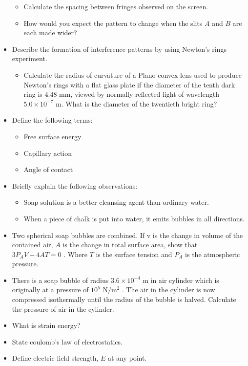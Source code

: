 \documentclass{article}
\begin{document}
\begin{itemize}
 \begin{itemize}
\item Calculate the spacing between fringes observed on the screen.
\item How would you expect the pattern to change when the slits $ A$ and $ B$ are each made wider?
\end{itemize}
\item Describe the formation of interference patterns by using Newton’s rings experiment.
 \begin{itemize}
\item Calculate the radius of curvature of a Plano-convex lens used to produce Newton’s rings with a flat glass plate if the diameter of the tenth dark ring is $ 4.48$ mm, viewed by normally reflected light of wavelength $ 5.0 \times 10^{-7}$ m.  What is the diameter of the twentieth bright ring?
\end{itemize}
\item Define the following terms:
 \begin{itemize}
\item Free surface energy
\item Capillary action
\item Angle of contact
\end{itemize}
\item Briefly explain the following observations:
 \begin{itemize}
\item Soap solution is a better cleansing agent than ordinary water.
\item When a piece of chalk is put into water, it emits bubbles in all directions.
\end{itemize}
\item Two spherical soap bubbles are combined.  If v is the change in volume of the contained air, $ A$ is the change in total surface area, show that $ 3P_{A}V+4A T=0$ . Where $ T$ is the surface tension and $ P_{A}$ is the atmospheric pressure.
\item There is a soap bubble of radius $ 3.6 \times 10^{-4}$ m in air cylinder which is originally at a pressure of $ 10^{5}$ N$/$m$ ^{2}$ . The air in the cylinder is now compressed isothermally until the radius of the bubble is halved. Calculate the pressure of air in the cylinder.
\item What is strain energy?
\item State coulomb’s law of electrostatics.
\item Define electric field strength, $ E$ at any point.

\end{itemize}
\end{document}

